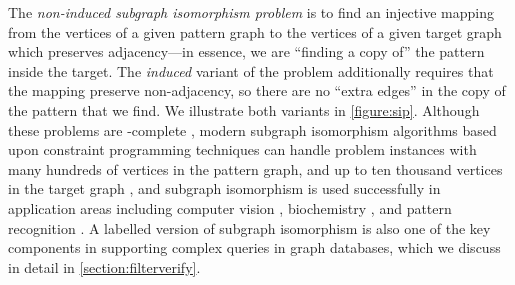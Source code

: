 \documentclass[twoside,11pt]{article}
\begin{document}
The \emph{non-induced subgraph isomorphism problem} is to find an injective mapping from the
vertices of a given pattern graph to the vertices of a given target graph which preserves
adjacency---in essence, we are ``finding a copy of'' the pattern inside the target. The
\emph{induced} variant of the problem additionally requires that the mapping preserve non-adjacency,
so there are no ``extra edges'' in the copy of the pattern that we find. We illustrate both variants
in \cref{figure:sip}.  Although these problems are \NP-complete \cite{DBLP:books/fm/GareyJ79}, modern subgraph
isomorphism algorithms based upon constraint programming techniques can handle problem instances
with many hundreds of vertices in the pattern graph, and up to ten thousand vertices in the target
graph
\cite{DBLP:journals/ai/Solnon10,DBLP:conf/cp/AudemardLMGP14,DBLP:conf/cp/McCreeshP15,DBLP:conf/lion/KotthoffMS16},
and subgraph isomorphism is used successfully in application areas including computer vision
\cite{DBLP:journals/cviu/DamiandSHJS11,DBLP:journals/pr/SolnonDHJ15}, biochemistry
\cite{o:10.1371/journal.pone.0076911,DBLP:conf/gbrpr/CarlettiFV15}, and pattern recognition
\cite{DBLP:journals/ijprai/ConteFSV04}.  A labelled version of subgraph isomorphism
is also one of the key components in supporting complex queries in graph databases, which we discuss in
detail in \cref{section:filterverify}.
\end{document}
